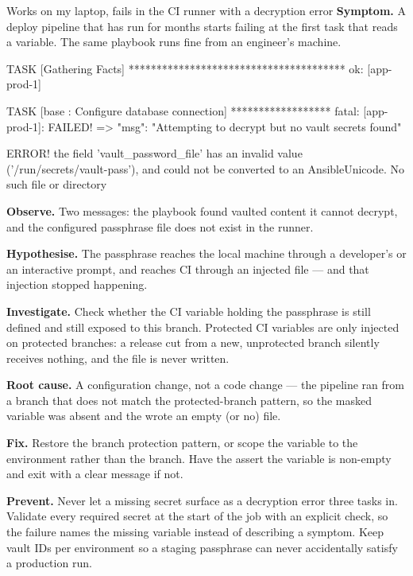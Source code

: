 \begin{debuglab}{Works on my laptop, fails in the CI runner with a decryption error}
\textbf{Symptom.} A deploy pipeline that has run for months starts failing at the first task that reads a variable. The same playbook runs fine from an engineer's machine.

\begin{outbox}
TASK [Gathering Facts] ***************************************
ok: [app-prod-1]

TASK [base : Configure database connection] ******************
fatal: [app-prod-1]: FAILED! => {"msg": "Attempting to decrypt
but no vault secrets found"}

ERROR! the field 'vault_password_file' has an invalid value
  ('/run/secrets/vault-pass'), and could not be converted to
  an AnsibleUnicode. No such file or directory
\end{outbox}

\begin{tickcheck}
  \item \textbf{Observe.} Two messages: the playbook found vaulted content it cannot decrypt, and the configured passphrase file does not exist in the runner.
  \item \textbf{Hypothesise.} The passphrase reaches the local machine through a developer's  or an interactive prompt, and reaches CI through an injected file --- and that injection stopped happening.
  \item \textbf{Investigate.} Check whether the CI variable holding the passphrase is still defined and still exposed to this branch. Protected CI variables are only injected on protected branches: a release cut from a new, unprotected branch silently receives nothing, and the file is never written.
  \item \textbf{Root cause.} A configuration change, not a code change --- the pipeline ran from a branch that does not match the protected-branch pattern, so the masked variable was absent and the  wrote an empty (or no) file.
  \item \textbf{Fix.} Restore the branch protection pattern, or scope the variable to the environment rather than the branch. Have the  assert the variable is non-empty and exit with a clear message if not.
  \item \textbf{Prevent.} Never let a missing secret surface as a decryption error three tasks in. Validate every required secret at the start of the job with an explicit check, so the failure names the missing variable instead of describing a symptom. Keep vault IDs per environment so a staging passphrase can never accidentally satisfy a production run.
\end{tickcheck}
\end{debuglab}

